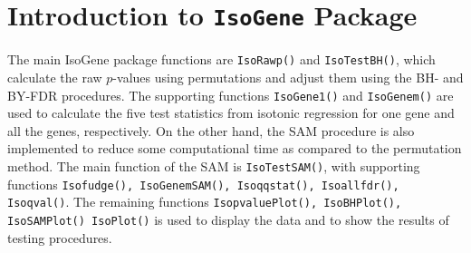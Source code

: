 \documentclass[10pt]{mybook4}
\begin{document}
\section{Introduction to \texttt{IsoGene} Package}
\label{sec: intro}







The main IsoGene package functions are \texttt{IsoRawp()} and
\texttt{IsoTestBH()}, which calculate the raw $p$-values using
permutations and adjust them using the BH- and BY-FDR procedures.
The supporting functions \texttt{IsoGene1()} and \texttt{IsoGenem()}
are used to calculate the five test statistics from isotonic
regression for one gene and all the genes, respectively. On the other hand,
the SAM procedure is also implemented to reduce some computational time as
compared to the permutation method. The main function of the SAM is \texttt{IsoTestSAM()},
with supporting functions \texttt{Isofudge(), IsoGenemSAM(), Isoqqstat(), Isoallfdr(), Isoqval()}.
The remaining functions \texttt{IsopvaluePlot(), IsoBHPlot(), IsoSAMPlot()
IsoPlot()} is used to display the data and
to show the results of testing procedures.
\end{document}

